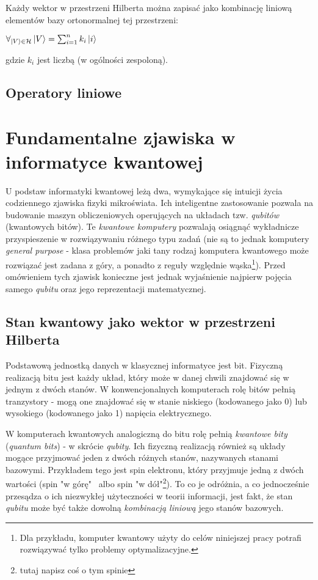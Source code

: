 \documentclass[12pt,a4paper,twoside,openany]{book}
\begin{document}
Każdy wektor w przestrzeni Hilberta można zapisać jako kombinację liniową elementów bazy ortonormalnej tej przestrzeni:
\begin{center}
    $\forall_{\ket{V}\in\mathcal{H}}\ket{V} = \sum_{i=1}^{n}k_{i}\ket{i}$
\end{center}
gdzie $k_{i}$ jest liczbą (w ogólności zespoloną).

\subsection{Operatory liniowe}



\section{Fundamentalne zjawiska w informatyce kwantowej}

U podstaw informatyki kwantowej leżą dwa, wymykające się intuicji życia codziennego zjawiska fizyki mikroświata. Ich inteligentne zastosowanie pozwala na budowanie maszyn obliczeniowych operujących na układach tzw. \textit{qubitów} (kwantowych bitów). Te \textit{kwantowe komputery} pozwalają osiągnąć wykładnicze przyspieszenie w rozwiązywaniu różnego typu zadań (nie są to jednak komputery \textit{general purpose} - klasa problemów jaki tany rodzaj komputera kwantowego może rozwiązać jest zadana z góry, a ponadto z reguły względnie wąska\footnote{Dla przykładu, komputer kwantowy użyty do celów niniejszej pracy potrafi rozwiązywać tylko problemy optymalizacyjne.}).
Przed omówieniem tych zjawisk konieczne jest jednak wyjaśnienie najpierw pojęcia samego \textit{qubitu} oraz jego reprezentacji matematycznej.

\subsection{Stan kwantowy jako wektor w przestrzeni Hilberta}

Podstawową jednostką danych w klasycznej informatyce jest bit. Fizyczną realizacją bitu jest każdy układ, który może w danej chwili znajdować się w jednym z dwóch stanów. W konwencjonalnych komputerach rolę bitów pełnią tranzystory - mogą one znajdować się w stanie niskiego (kodowanego jako 0) lub wysokiego (kodowanego jako 1) napięcia elektrycznego.

W komputerach kwantowych analogiczną do bitu rolę pełnią \textit{kwantowe bity} (\textit{quantum bits}) - w skrócie \textit{qubity}. Ich fizyczną realizacją również są układy mogące przyjmować jeden z dwóch różnych stanów, nazywanych stanami bazowymi. Przykładem tego jest spin elektronu, który przyjmuje jedną z dwóch wartości (spin "w górę" ~albo spin "w dół"\footnote{tutaj napisz coś o tym spinie}). To co je odróżnia, a co jednocześnie przesądza o ich niezwykłej użyteczności w teorii informacji, jest fakt, że stan \textit{qubitu} może być także dowolną \textit{kombinacją liniową} jego stanów bazowych.
\end{document}

